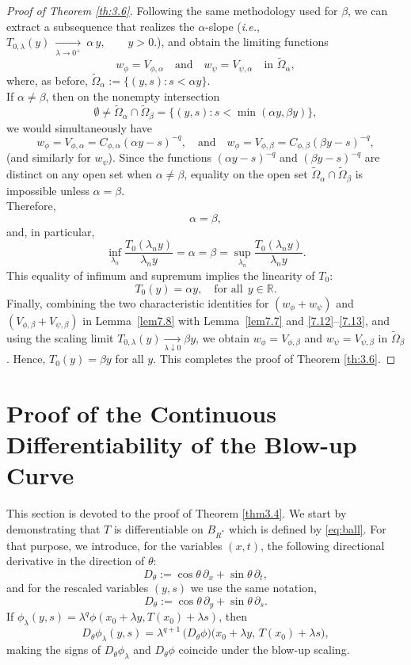 \documentclass[
  sn-mathphys-num,
  colorlinks,
  linkcolor=darkmagenta,
  citecolor=rufous,
  urlcolor=zaffre,
  hypertexnames=false
]{sn-jnl}
\numberwithin{equation}{section}
\begin{document}
\begin{proof}[Proof of Theorem \ref{th:3.6}]
Following the same methodology used for $\beta$, we can extract a subsequence that realizes the $\alpha$-slope (\textit{i.e.}, $
T_{0,\lambda}(y)\ \xrightarrow[\lambda\to 0^+]{}\ \alpha\,y,\qquad y>0.
$), and obtain the limiting functions
$$
w_\phi = V_{\phi, \alpha} \quad \text{and} \quad w_\psi = V_{\psi, \alpha} \quad \text{in } \tilde{\Omega}_\alpha,
$$
where, as before, $\tilde{\Omega}_\alpha := \{(y,s): s<\alpha y\}$.\\
If $\alpha \neq \beta$, then on the nonempty intersection
$$
\emptyset \neq \tilde{\Omega}_\alpha \cap \tilde{\Omega}_\beta
=\{(y,s): s<\min(\alpha y,\beta y)\},
$$
we would simultaneously have
$$
w_\phi = V_{\phi,\alpha}=C_{\phi,\alpha}(\alpha y-s)^{-q},
\quad\text{and}\quad
w_\phi = V_{\phi,\beta}=C_{\phi,\beta}(\beta y-s)^{-q},
$$
(and similarly for $w_\psi$). Since the functions $(\alpha y-s)^{-q}$ and $(\beta y-s)^{-q}$ are distinct on any open set when $\alpha\neq\beta$, equality on the open set $\tilde{\Omega}_\alpha\cap\tilde{\Omega}_\beta$ is impossible unless $\alpha=\beta$.\\
Therefore,
$$
\alpha=\beta,
$$
and, in particular,
$$
\inf_{\lambda_n} \frac{T_0(\lambda_n y)}{\lambda_n y}
= \alpha = \beta
= \sup_{\lambda_n} \frac{T_0(\lambda_n y)}{\lambda_n y}.
$$
This equality of infimum and supremum implies the linearity of $T_0$:
$$
T_0(y) = \alpha y, \quad \text{for all} \ \ y \in \mathbb{R}.
$$
Finally, combining the two characteristic identities for $(w_\phi+w_\psi)$ and $(V_{\phi,\beta}+V_{\psi,\beta})$  in Lemma~\ref{lem7.8} with  Lemma~\ref{lem7.7} and  \eqref{7.12}–\eqref{7.13}, and using the scaling limit $T_{0,\lambda}(y)\xrightarrow[\lambda\downarrow 0]{}\beta y$, we obtain $w_\phi=V_{\phi,\beta}$ and $w_\psi=V_{\psi,\beta}$ in $\tilde{\Omega}_\beta$. Hence, $T_0(y)=\beta y$ for all $y$.
This completes the proof of Theorem \ref{th:3.6}.
\end{proof}
\section{Proof of the Continuous Differentiability of the Blow-up Curve}
\label{section8}

This section is devoted to the proof of Theorem \ref{thm3.4}. We start by demonstrating that $T$ is differentiable on $B_{R^*}$ which is defined by \eqref{eq:ball}. For that purpose, we introduce, for the variables $(x,t)$, the following directional derivative in the direction of $\theta$:
$$
D_\theta := \cos\theta\,\partial_x + \sin\theta\,\partial_t,
$$
and for the rescaled variables $(y,s)$ we use the same notation, 
$$
D_\theta := \cos\theta\,\partial_y + \sin\theta\,\partial_s.
$$
If $\phi_\lambda(y,s)=\lambda^{q}\phi(x_0+\lambda y,T(x_0)+\lambda s)$, then
\begin{equation}\label{eq:scaling-Dtheta}
D_\theta \phi_\lambda(y,s)
= \lambda^{q+1}\, \bigl(D_\theta \phi\bigr)\bigl(x_0+\lambda y,\,T(x_0)+\lambda s\bigr),
\end{equation}
making the signs of $D_\theta\phi_\lambda$ and  $D_\theta\phi$ coincide under the blow-up scaling.
\end{document}
